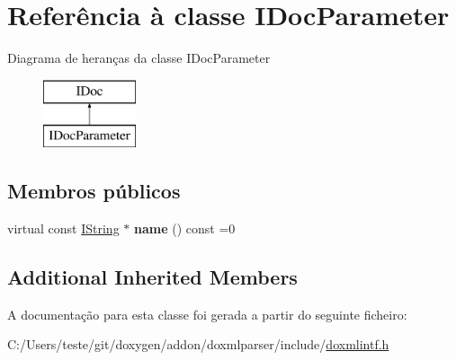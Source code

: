\hypertarget{class_i_doc_parameter}{\section{Referência à classe I\-Doc\-Parameter}
\label{class_i_doc_parameter}
}
Diagrama de heranças da classe I\-Doc\-Parameter\begin{figure}[H]
\begin{center}
\leavevmode
\includegraphics[height=2.000000cm]{class_i_doc_parameter}
\end{center}
\end{figure}
\subsection*{Membros públicos}
\begin{DoxyCompactItemize}
\item 
\hypertarget{class_i_doc_parameter_af687440943d0a80c2b38cd5bb51b7a68}{virtual const \hyperlink{class_i_string}{I\-String} $\ast$ {\bfseries name} () const =0}\label{class_i_doc_parameter_af687440943d0a80c2b38cd5bb51b7a68}

\end{DoxyCompactItemize}
\subsection*{Additional Inherited Members}


A documentação para esta classe foi gerada a partir do seguinte ficheiro\-:\begin{DoxyCompactItemize}
\item 
C\-:/\-Users/teste/git/doxygen/addon/doxmlparser/include/\hyperlink{include_2doxmlintf_8h}{doxmlintf.\-h}\end{DoxyCompactItemize}
